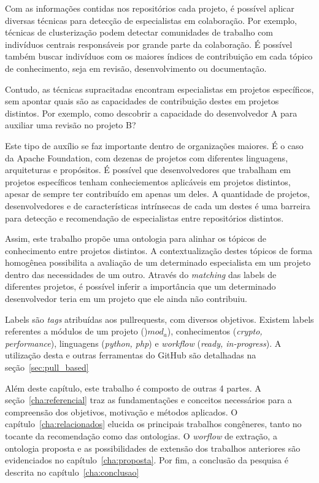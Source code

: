 \documentclass[sigconf]{acmart}
\begin{document}
Com as informações contidas nos repositórios cada projeto, é possível aplicar diversas técnicas para detecção de especialistas em colaboração. Por exemplo, técnicas de clusterização podem detectar comunidades de trabalho com indivíduos centrais responsáveis por grande parte da colaboração. É possível também buscar indivíduos com os maiores índices de contribuição em cada tópico de conhecimento, seja em revisão, desenvolvimento ou documentação.

Contudo, as técnicas supracitadas encontram especialistas em projetos específicos, sem apontar quais são as capacidades de contribuição destes em projetos distintos. Por exemplo, como descobrir a capacidade do desenvolvedor A para auxiliar uma revisão no projeto B?

Este tipo de auxílio se faz importante dentro de organizações maiores. É o caso da Apache Foundation, com dezenas de projetos com diferentes linguagens, arquiteturas e propósitos. É possível que desenvolvedores que trabalham em projetos específicos tenham conheciementos aplicáveis em projetos distintos, apesar de sempre ter contribuído em apenas um deles. A quantidade de projetos, desenvolvedores e de características intrínsecas de cada um destes é uma barreira para detecção e recomendação de especialistas entre repositórios distintos.

Assim, este trabalho propõe uma ontologia para alinhar os tópicos de conhecimento entre projetos distintos. A contextualização destes tópicos de forma homogênea possibilita a avaliação de um determinado especialista em um projeto dentro das necessidades de um outro. Através do \textit{matching} das labels de diferentes projetos, é possível inferir a importância que um determinado desenvolvedor teria em um projeto que ele ainda não contribuiu.

Labels são \textit{tags} atribuídas aos pullrequests, com diversos objetivos. Existem labels referentes a módulos de um projeto ()\textit{$mod_a$}), conhecimentos (\textit{crypto, performance}), linguagens (\textit{python, php}) e \textit{workflow} (\textit{ready, in-progress}). A utilização desta e outras ferramentas do GitHub são detalhadas na seção~\ref{sec:pull_based}

Além deste capítulo, este trabalho é composto de outras 4 partes. A seção~\ref{cha:referencial} traz as fundamentações e conceitos necessários para a compreensão dos objetivos, motivação e métodos aplicados. O capítulo~\ref{cha:relacionados} elucida os principais trabalhos congêneres, tanto no tocante da recomendação como das ontologias. O \textit{worflow} de extração, a ontologia proposta e as possibilidades de extensão dos trabalhos anteriores são evidenciados no capítulo~\ref{cha:proposta}. Por fim, a conclusão da pesquisa é descrita no capítulo~\ref{cha:conclusao}
\end{document}
